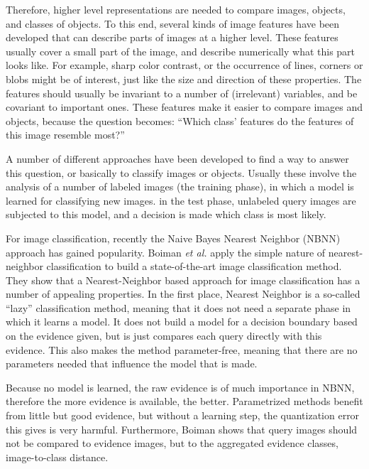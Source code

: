 Therefore, higher level representations are needed to compare images, objects, and classes of objects. To this end, several kinds of image features have been developed that can describe parts of images at a higher level. These features usually cover a small part of the image, and describe numerically what this part looks like. For example, sharp color contrast, or the occurrence of lines, corners or blobs might be of interest, just like the size and direction of these properties. The features should usually be invariant to a number of (irrelevant) variables, and be covariant to important ones. These features make it easier to compare images and objects, because the question becomes: ``Which class' features do the features of this image resemble most?''

A number of different approaches have been developed to find a way to answer this question, or basically to classify images or objects. Usually these involve the analysis of a number of labeled images (the training phase), in which a model is learned for classifying new images. in the test phase, unlabeled query images are subjected to this model, and a decision is made which class is most likely.

For image classification, recently the Naive Bayes Nearest Neighbor (NBNN) \cite{boiman2008defense} approach has gained popularity. \cite{becker2012codebook, behmo2010towards, mccann2012local, timofte2012iterative, tuytelaars2011nbnn, wang2011improved, zhang2010random} Boiman \emph{et al.} apply the simple nature of nearest-neighbor classification to build a state-of-the-art image classification method. They show that a Nearest-Neighbor based approach for image classification has a number of appealing properties. In the first place, Nearest Neighbor is a so-called ``lazy'' classification method, meaning that it does not need a separate phase in which it learns a model. It does not build a model for a decision boundary based on the evidence given, but is just compares each query directly with this evidence. This also makes the method parameter-free, meaning that there are no parameters needed that influence the model that is made.

Because no model is learned, the raw evidence is of much importance in NBNN, therefore the more evidence is available, the better. Parametrized methods benefit from little but good evidence, but without a learning step, the quantization error this gives is very harmful. Furthermore, Boiman shows that query images should not be compared to evidence images, but to the aggregated evidence classes, image-to-class distance.

